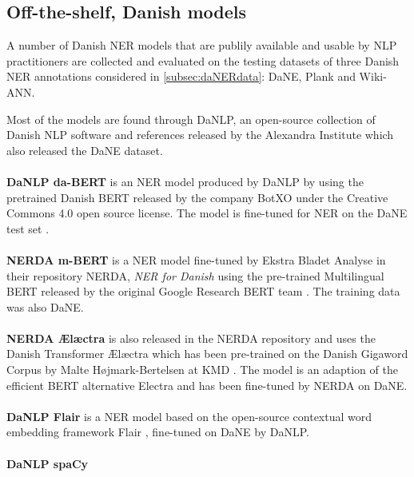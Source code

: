 \documentclass[main.tex]{subfiles}
\begin{document}
\subsection{Off-the-shelf, Danish models}
\label{sec:exidan}
A number of Danish NER models that are publily available and usable by NLP practitioners are collected and evaluated on the testing datasets of three Danish NER annotations considered in \ref{subsec:daNERdata}: DaNE, Plank and Wiki-ANN.

Most of the models are found through DaNLP\footnotemark, an open-source collection of Danish NLP software and references released by the Alexandra Institute which also released the DaNE dataset.
\\
\\
\textbf{DaNLP da-BERT}
is an NER model produced by DaNLP by using the pretrained Danish BERT released by the company BotXO \cite{botxo2019dabert} under the Creative Commons 4.0 open source license.
The model is fine-tuned for NER on the DaNE test set \cite{hvingelby2020dane}.\\
\\
\textbf{NERDA m-BERT}
is a NER model fine-tuned by Ekstra Bladet Analyse in their repository NERDA\footnotemark, \emph{NER for Danish} using the pre-trained Multilingual BERT released by the original Google Research BERT team \cite{devlin2019bert}.
The training data was also DaNE.
\\
\\
\textbf{NERDA Ælæctra}
is also released in the NERDA repository and uses the Danish Transformer Ælæctra which has been pre-trained on the Danish Gigaword Corpus by Malte Højmark-Bertelsen at KMD \cite{bertelsen2020lctra}.
The model is an adaption of the efficient BERT alternative Electra \cite{clark2020electra} and has been fine-tuned by NERDA on DaNE.\\
\\
\textbf{DaNLP Flair}
is a NER model based on the open-source contextual word embedding framework Flair \cite{akbik2019flair}, fine-tuned on DaNE by DaNLP.\\
\\
\textbf{DaNLP spaCy}
\end{document}
